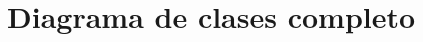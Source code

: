 \graphicspath{{anexos/AnexoB-Diagrama-Clases-Completo/recursos/}}

\section{Diagrama de clases completo} \label{Anexo:diagrama-clases}

